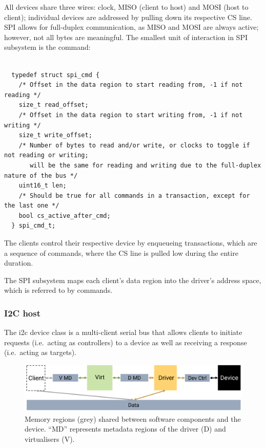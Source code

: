 \documentclass[a4paper,12pt]{report}
\newcommand{\figscale}{0.2}
\begin{document}
All devices share three wires: clock, MISO (client to host) and MOSI (host to client); individual 
devices are addressed by pulling down its respective CS line.
SPI allows for full-duplex communication, as MISO and MOSI are always active; however, not all bytes
are meaningful. 
The smallest unit of interaction in SPI subsystem is the command:

\begin{lstlisting}[gobble=2,firstline=2,float=th,
  label={l:SPI_command_definition},
  caption={SPI Command definition.}]

  typedef struct spi_cmd {
    /* Offset in the data region to start reading from, -1 if not reading */
    size_t read_offset;
    /* Offset in the data region to start writing from, -1 if not writing */
    size_t write_offset;
    /* Number of bytes to read and/or write, or clocks to toggle if not reading or writing;
       will be the same for reading and writing due to the full-duplex nature of the bus */
    uint16_t len;
    /* Should be true for all commands in a transaction, except for the last one */
    bool cs_active_after_cmd;
  } spi_cmd_t;

\end{lstlisting}

The clients control their respective device by enqueueing transactions, which are a sequence of
commands, where the CS line is pulled low during the entire duration. 

The SPI subsystem maps each client's data region into the driver's address space, which is referred
to by commands. 

\subsubsection{I2C host}\label{s:cl-i2c}

The \gls{i2c} device class is a multi-client serial bus that allows
clients to initiate
requests (i.e.\ acting as controllers) to a device as well as receiving a response (i.e.\
acting as targets).

\begin{figure}[th]
  \centering
  \includegraphics[scale=\figscale]{i2c}
  \caption[Memory regions shared between software components
    and the device.]{Memory regions (grey) shared between software components
    and the device. ``MD'' represents metadata regions of the driver (D) and virtualisers (V).}
  \label{f:i2c_diagram}
\end{figure}
\end{document}
